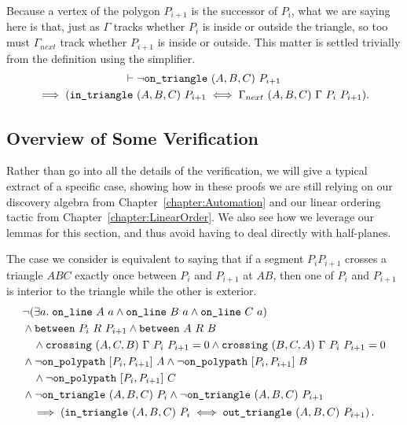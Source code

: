 Because a vertex of the polygon $P_{i+1}$ is the successor of $P_i$, what we are saying here is that, just as $\Gamma$ tracks whether $P_i$ is inside or outside the triangle, so too must $\Gamma_{next}$ track whether $P_{i+1}$ is inside or outside. This matter is settled trivially from the definition using the simplifier.
\begin{multline*}
\vdash\neg\texttt{on\_triangle}\ (A,B,C)\ P_{i+1}\\
\implies (\texttt{in\_triangle}\ (A,B,C)\ P_{i+1} \iff \Gamma_{next}\ (A,B,C)\ \Gamma\ P_i\ P_{i+1}).
\end{multline*}

\subsection{Overview of Some Verification}
Rather than go into all the details of the verification, we will give a typical extract of a specific case, showing how in these proofs we are still relying on our discovery algebra from Chapter~\ref{chapter:Automation} and our linear ordering tactic from Chapter~\ref{chapter:LinearOrder}. We also see how we leverage our lemmas for this section, and thus avoid having to deal directly with half-planes.

The case we consider is equivalent to saying that if a segment $P_iP_{i+1}$ crosses a triangle $ABC$ exactly once between $P_i$ and $P_{i+1}$ at $AB$, then one of $P_i$ and $P_{i+1}$ is interior to the triangle while the other is exterior.
\begin{multline}\label{eq:IH3}
  \begin{aligned}
    &\neg(\exists a.\; \texttt{on\_line}\ A\ a\wedge \texttt{on\_line}\ B\ a\wedge \texttt{on\_line}\ C\ a)\\
    &\wedge\texttt{between}\ P_i\ R\ P_{i+1} \wedge \texttt{between}\ A\ R\ B \\
    &\quad\wedge\texttt{crossing}\ (A,C,B)\ \Gamma\ P_i\ P_{i+1} = 0\wedge\texttt{crossing}\ (B,C,A)\ \Gamma\ P_i\ P_{i+1} = 0\\
    &\wedge\neg\texttt{on\_polypath}\ [P_i,P_{i+1}]\ A \wedge \neg\texttt{on\_polypath}\ [P_i,P_{i+1}]\ B \\
    &\quad\wedge \neg\texttt{on\_polypath}\ [P_i,P_{i+1}]\ C\\
    &\wedge\neg\texttt{on\_triangle}\ (A,B,C)\ P_i \wedge\neg\texttt{on\_triangle}\ (A,B,C)\ P_{i+1}
  \end{aligned}\\
  \implies\left(\texttt{in\_triangle}\ (A,B,C)\ P_i \iff \texttt{out\_triangle}\ (A,B,C)\ P_{i+1}\right).
\end{multline}

